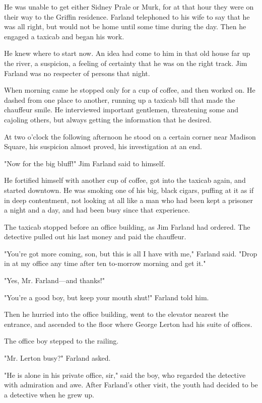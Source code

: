 \documentclass{novel}
\begin{document}
He was unable to get either Sidney Prale or Murk, for at that hour they were on their way to the Griffin residence. Farland telephoned to his wife to say that he was all right, but would not be home until some time during the day. Then he engaged a taxicab and began his work.

He knew where to start now. An idea had come to him in that old house far up the river, a suspicion, a feeling of certainty that he was on the right track. Jim Farland was no respecter of persons that night.

When morning came he stopped only for a cup of coffee, and then worked on. He dashed from one place to another, running up a taxicab bill that made the chauffeur smile. He interviewed important gentlemen, threatening some and cajoling others, but always getting the information that he desired.

At two o'clock the following afternoon he stood on a certain corner near Madison Square, his suspicion almost proved, his investigation at an end.

"Now for the big bluff!" Jim Farland said to himself.

He fortified himself with another cup of coffee, got into the taxicab again, and started downtown. He was smoking one of his big, black cigars, puffing at it as if in deep contentment, not looking at all like a man who had been kept a prisoner a night and a day, and had been busy since that experience.

The taxicab stopped before an office building, as Jim Farland had ordered. The detective pulled out his last money and paid the chauffeur.

"You're got more coming, son, but this is all I have with me," Farland said. "Drop in at my office any time after ten to-morrow morning and get it."

"Yes, Mr. Farland---and thanks!"

"You're a good boy, but keep your mouth shut!" Farland told him.

Then he hurried into the office building, went to the elevator nearest the entrance, and ascended to the floor where George Lerton had his suite of offices.

The office boy stepped to the railing.

"Mr. Lerton busy?" Farland asked.

"He is alone in his private office, sir," said the boy, who regarded the detective with admiration and awe. After Farland's other visit, the youth had decided to be a detective when he grew up.
\end{document}
